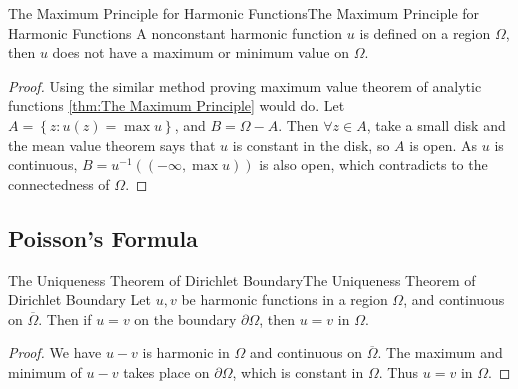 \documentclass[../main.tex]{subfiles}
\begin{document}
\begin{theorem}{The Maximum Principle for Harmonic Functions}{The Maximum Principle for Harmonic Functions}
	A nonconstant harmonic function $u$ is defined on a region $\Omega$, then $u$ does not have a maximum or minimum value on $\Omega$.
\end{theorem}
\begin{proof}
	Using the similar method proving maximum value theorem of analytic functions \ref{thm:The Maximum Principle} would do. Let $A = \left\{ z: u(z) = \max u \right\}$, and $B = \Omega-A$. Then $\forall z\in A$, take a small disk and the mean value theorem says that $u$ is constant in the disk, so $A$ is open. As $u$ is continuous, $B = u^{-1}((-\infty ,\max u))$ is also open, which contradicts to the connectedness of $\Omega$.
\end{proof}

\subsection{Poisson's Formula}

\begin{theorem}{The Uniqueness Theorem of Dirichlet Boundary}{The Uniqueness Theorem of Dirichlet Boundary}
	Let $u,v$ be harmonic functions in a region $\Omega$, and continuous on $\overline{\Omega}$. Then if $u=v$ on the boundary $\partial \Omega$, then $u=v$ in $\Omega$.
\end{theorem}
\begin{proof}
	We have $u-v$ is harmonic in $\Omega$ and continuous on $\overline{\Omega}$. The maximum and minimum of $u-v$ takes place on $\partial \Omega$, which is constant in $\Omega$. Thus $u=v$ in $\Omega$.
\end{proof}
\end{document}
